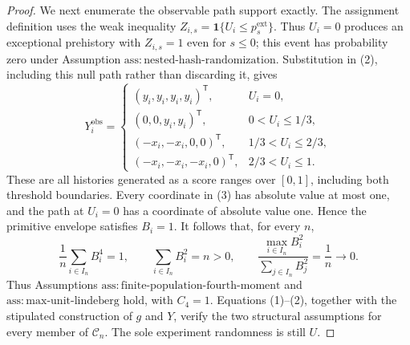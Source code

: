 \documentclass{article}
\begin{document}
\begin{proof}
We next enumerate the observable path support exactly.  The assignment definition uses the weak inequality \(Z_{i,s}=\mathbf 1\{U_i\le p_s^{\mathrm{ext}}\}\).  Thus \(U_i=0\) produces an exceptional prehistory with \(Z_{i,s}=1\) even for \(s\le0\); this event has probability zero under Assumption \(\mathrm{ass:nested\text{-}hash\text{-}randomization}\).  Substitution in (2), including this null path rather than discarding it, gives
\[
Y_i^{\mathrm{obs}}=
\begin{cases}
(y_i,y_i,y_i,y_i)^{\mathsf T},&U_i=0,\\
(0,0,y_i,y_i)^{\mathsf T},&0<U_i\le1/3,\\
(-x_i,-x_i,0,0)^{\mathsf T},&1/3<U_i\le2/3,\\
(-x_i,-x_i,-x_i,0)^{\mathsf T},&2/3<U_i\le1.
\end{cases}
\tag{3}
\]
These are all histories generated as a score ranges over \([0,1]\), including both threshold boundaries.  Every coordinate in (3) has absolute value at most one, and the path at \(U_i=0\) has a coordinate of absolute value one.  Hence the primitive envelope satisfies \(B_i=1\).  It follows that, for every \(n\),
\[
\frac1n\sum_{i\in I_n}B_i^4=1,
\qquad
\sum_{i\in I_n}B_i^2=n>0,
\qquad
\frac{\max_{i\in I_n}B_i^2}{\sum_{j\in I_n}B_j^2}
=\frac1n\longrightarrow0.
\tag{4}
\]
Thus Assumptions \(\mathrm{ass:finite\text{-}population\text{-}fourth\text{-}moment}\) and \(\mathrm{ass:max\text{-}unit\text{-}lindeberg}\) hold, with \(C_4=1\).  Equations (1)--(2), together with the stipulated construction of \(g\) and \(Y\), verify the two structural assumptions for every member of \(\mathcal C_n\).  The sole experiment randomness is still \(U\).


\end{proof}
\end{document}
